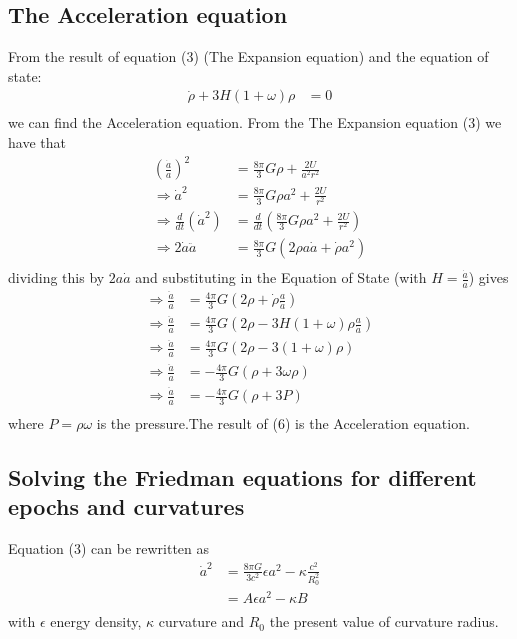\documentclass[a4paper, 11pt]{FSKH_623_Report}
\numberwithin{equation}{section}
\newcommand{\driv}[2]{\frac{d #1}{d #2}}
\begin{document}
\subsection*{The Acceleration equation}
From the result of equation (3) (The Expansion equation) and the equation of state:
\begin{equation}
\begin{split}
\dot{\rho}+3H\left(1+\omega\right)\rho &= 0\\
\end{split}
\end{equation}
we can find the Acceleration equation.
From the The Expansion equation (3) we have that
\begin{equation}
\begin{split}
\left(\frac{\dot{a}}{a}\right)^{2} &= \frac{8\pi}{3}G\rho+\frac{2U}{a^{2}r^{2}}\\
\Rightarrow \dot{a}^{2} &= \frac{8\pi}{3}G\rho a^{2}+\frac{2U}{r^{2}}\\
\Rightarrow \driv{}{t}\left(\dot{a}^{2}\right) &= \driv{}{t}\left(\frac{8\pi}{3}G\rho a^{2}+\frac{2U}{r^{2}}\right)\\
\Rightarrow 2\dot{a}\ddot{a} &= \frac{8\pi}{3}G\left(2\rho a\dot{a}+\dot{\rho}a^{2}\right)\\
\end{split}
\end{equation}
dividing this by $2a\dot{a}$ and substituting in the Equation of State (with $H=\frac{\dot{a}}{a}$) gives
\begin{equation}
\begin{split}
\Rightarrow \frac{\ddot{a}}{a} &= \frac{4\pi}{3}G\left(2\rho +\dot{\rho}\frac{a}{\dot{a}}\right)\\
\Rightarrow \frac{\ddot{a}}{a} &= \frac{4\pi}{3}G\left(2\rho -3H\left(1+\omega\right)\rho\frac{a}{\dot{a}}\right)\\
\Rightarrow \frac{\ddot{a}}{a} &= \frac{4\pi}{3}G\left(2\rho -3\left(1+\omega\right)\rho\right)\\
\Rightarrow \frac{\ddot{a}}{a} &= -\frac{4\pi}{3}G\left(\rho +3\omega\rho\right)\\
\Rightarrow \frac{\ddot{a}}{a} &= -\frac{4\pi}{3}G\left(\rho +3P\right)\\
\end{split}
\end{equation}
where $P=\rho\omega$ is the pressure.The result of (6) is the Acceleration equation.

\pagebreak
\subsection*{Solving the Friedman equations for different epochs and curvatures}
Equation (3) can be rewritten as \citep{notes4}
\begin{equation}
\begin{split}
\dot{a}^{2} &= \frac{8\pi G}{3c^{2}}\epsilon a^{2}-\kappa\frac{c^{2}}{R_{0}^{2}}\\
&= A\epsilon a^{2}-\kappa B\\
\end{split}
\end{equation}
with $\epsilon$ energy density, $\kappa$ curvature and $R_{0}$ the present value of curvature radius.
\end{document}
